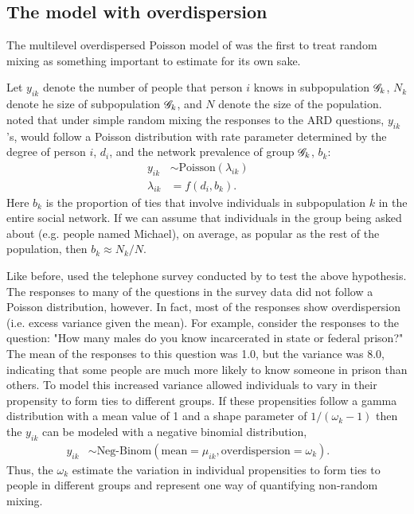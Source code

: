\subsection{The \citet{Zheng+others:2006} model with overdispersion}
\label{subsec:overdispersion}

The multilevel overdispersed Poisson model of \citet{Zheng+others:2006} was the first to treat random mixing as something important to estimate for its own sake. 

Let $y_{ik}$ denote the number of people that person $i$ knows in subpopulation $\mathcal{G}_k$, $N_k$ denote he size of subpopulation $\mathcal{G}_k$, and $N$ denote the size of the population. \citet{Zheng+others:2006} noted that under simple random mixing the responses to the ARD questions, $y_{ik}$'s, would follow a Poisson distribution with rate parameter determined by the degree of person $i$, $d_i$, and the network prevalence of group $\mathcal{G}_k$, $b_k$:
\begin{align}
y_{ik} &\sim \text{Poisson}(\lambda_{ik}) && \\\nonumber
\lambda_{ik} &= f(d_i, b_k).
\end{align}
Here $b_k$ is the proportion of ties that involve individuals in subpopulation $k$ in the entire social network. If we can assume that individuals in the group being asked about (e.g. people named Michael), on average, as popular as the rest of the population, then $b_k \approx N_k/N$.

Like \citet{Killworth+others:1998} before, \citet{Zheng+others:2006} used the telephone survey conducted by \citet{McCarty+others:2001} to test the above hypothesis. The responses to many of the questions in the survey data did not follow a Poisson distribution, however. In fact, most of the responses show overdispersion (i.e. excess variance given the mean). For example, consider the responses to the question: "How many males do you know incarcerated in state or federal prison?" The mean of the responses to this question was 1.0, but the variance was 8.0, indicating that some people are much more likely to know someone in prison than others. To model this increased variance \citet{Zheng+others:2006} allowed individuals to vary in their propensity to form ties to different groups. If these propensities follow a gamma distribution with a mean value of 1 and a shape parameter of $1/(\omega_k-1)$ then the $y_{ik}$ can be modeled with a negative binomial distribution,
\begin{align}
y_{ik} &\sim \text{Neg-Binom}(\text{mean} = \mu_{ik}, \text{overdispersion} = \omega_k). && \label{eq:overdispersion}
\end{align}
Thus, the $\omega_k$ estimate the variation in individual propensities to form ties to people in different groups and represent one way of quantifying non-random mixing. 

